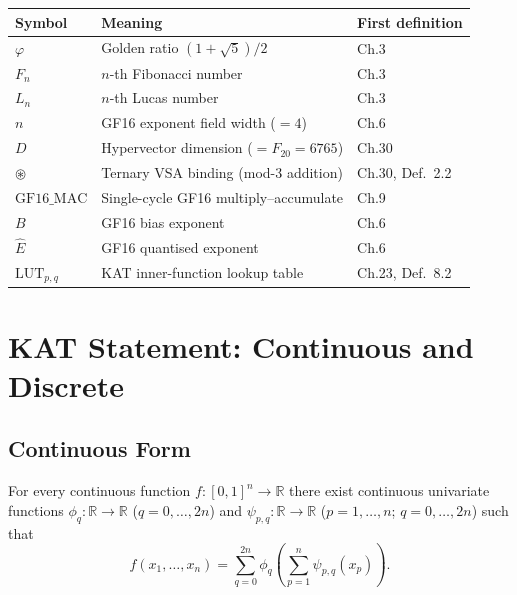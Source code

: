 \begin{longtable}[]{@{}lll@{}}
\toprule\noalign{}
Symbol & Meaning & First definition \\
\midrule\noalign{}
\endhead
\bottomrule\noalign{}
\endlastfoot
$\varphi$ & Golden ratio $(1+\sqrt{5})/2$ & Ch.3 \\
$F_n$ & $n$-th Fibonacci number & Ch.3 \\
$L_n$ & $n$-th Lucas number & Ch.3 \\
$n$ & GF16 exponent field width ($= 4$) & Ch.6 \\
$D$ & Hypervector dimension ($= F_{20} = 6765$) & Ch.30 \\
$\circledast$ & Ternary VSA binding (mod-3 addition) & Ch.30, Def.~2.2 \\
$\mathrm{GF16\_MAC}$ & Single-cycle GF16 multiply--accumulate & Ch.9 \\
$B$ & GF16 bias exponent & Ch.6 \\
$\hat{E}$ & GF16 quantised exponent & Ch.6 \\
$\mathrm{LUT}_{p,q}$ & KAT inner-function lookup table & Ch.23, Def.~8.2 \\
\end{longtable}

\section{KAT Statement: Continuous and Discrete}
\label{app:G-kat-statement}

\subsection{Continuous Form}

\begin{theorem}
\label{thm:G-kat-continuous}
For every continuous function $f\colon [0,1]^n \to \mathbb{R}$ there
exist continuous univariate functions
$\phi_q\colon \mathbb{R} \to \mathbb{R}$ ($q = 0, \ldots, 2n$) and
$\psi_{p,q}\colon \mathbb{R} \to \mathbb{R}$ ($p = 1, \ldots, n$;
$q = 0, \ldots, 2n$) such that
\begin{equation}
\label{eq:G-kat}
f(x_1, \ldots, x_n) = \sum_{q=0}^{2n} \phi_q\!\left(\sum_{p=1}^{n} \psi_{p,q}(x_p)\right).
\end{equation}
\end{theorem}

